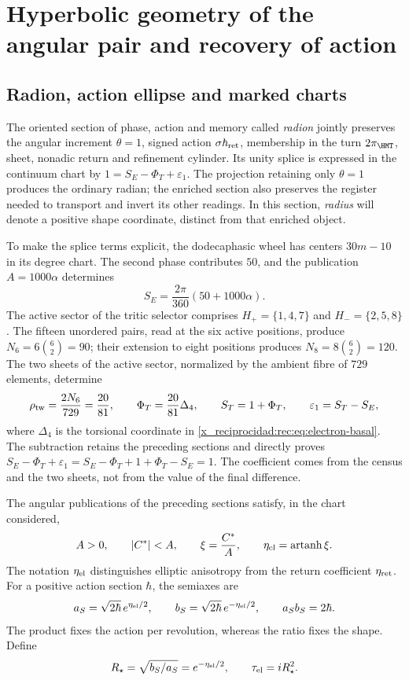\chapter{Hyperbolic geometry of the angular pair and recovery of action}
\label{x_reciprocidad:rec:radial}

\section{Radion, action ellipse and marked charts}

The oriented section of phase, action and memory called \emph{radion} jointly preserves the angular increment \(\theta=1\), signed action \(\sigma\hbar_{\rm ret}\), membership in the turn \(2\pi_{\HMT}\), sheet, nonadic return and refinement cylinder. Its unity splice is expressed in the continuum chart by \(1=S_E-\Phi_T+\varepsilon_1\). The projection retaining only \(\theta=1\) produces the ordinary radian; the enriched section also preserves the register needed to transport and invert its other readings. In this section, \emph{radius} will denote a positive shape coordinate, distinct from that enriched object.

To make the splice terms explicit, the dodecaphasic wheel has centers \(30m-10\) in its degree chart. The second phase contributes \(50\), and the publication \(A=1000\alpha\) determines
\[
 S_E=\frac{2\pi}{360}(50+1000\alpha).
\]
The active sector of the tritic selector comprises \(H_+=\{1,4,7\}\) and \(H_-=\{2,5,8\}\). The fifteen unordered pairs, read at the six active positions, produce \(N_6=6\binom62=90\); their extension to eight positions produces \(N_8=8\binom62=120\). The two sheets of the active sector, normalized by the ambient fibre of \(729\) elements, determine
\[
 \rho_{\rm tw}=\frac{2N_6}{729}=\frac{20}{81},\qquad
 \Phi_T=\frac{20}{81}\Delta_4,\qquad
 S_T=1+\Phi_T,\qquad \varepsilon_1=S_T-S_E,
\]
where \(\Delta_4\) is the torsional coordinate in \eqref{x_reciprocidad:rec:eq:electron-basal}. The subtraction retains the preceding sections and directly proves
\(S_E-\Phi_T+\varepsilon_1=S_E-\Phi_T+1+\Phi_T-S_E=1\).
The coefficient comes from the census and the two sheets, not from the value of the final difference.

The angular publications of the preceding sections satisfy, in the chart considered,
\[
 A>0,\qquad |C^*|<A,\qquad
 \xi=\frac{C^*}{A},\qquad \eta_{\rm el}=\operatorname{artanh}\xi.
\]
The notation \(\eta_{\rm el}\) distinguishes elliptic anisotropy from the return coefficient \(\eta_{\rm ret}\). For a positive action section \(\hbar\), the semiaxes are
\begin{equation}
 a_S=\sqrt{2\hbar}\,e^{\eta_{\rm el}/2},\qquad
 b_S=\sqrt{2\hbar}\,e^{-\eta_{\rm el}/2},\qquad a_Sb_S=2\hbar.
 \label{x_reciprocidad:rec:eq:elipse}
\end{equation}
The product fixes the action per revolution, whereas the ratio fixes the shape. Define
\[
 R_\star=\sqrt{b_S/a_S}=e^{-\eta_{\rm el}/2},\qquad
 \tau_{\rm el}=iR_\star^2.
\]

